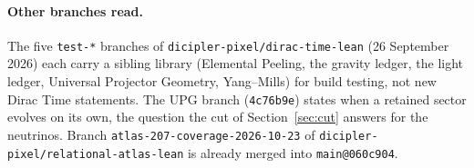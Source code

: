 \paragraph{Other branches read.} The five \texttt{test-*} branches of \texttt{dicipler-pixel/dirac-time-lean} (26 September 2026) each carry a sibling library (Elemental Peeling, the gravity ledger, the light ledger, Universal Projector Geometry, Yang--Mills) for build testing, not new Dirac Time statements. The UPG branch (\texttt{4c76b9e}) states when a retained sector evolves on its own, the question the cut of Section~\ref{sec:cut} answers for the neutrinos. Branch \texttt{atlas-207-coverage-2026-10-23} of \texttt{dicipler-pixel/relational-atlas-lean} is already merged into \texttt{main@060c904}.
